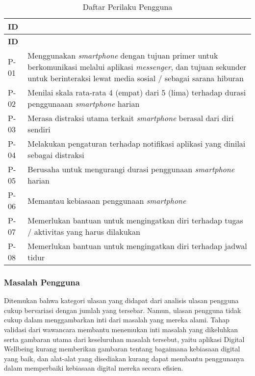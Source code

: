 \RaggedLeft
\begin{small}
\begin{longtable}[c]{|W{c}{0.08\textwidth}|>{\ccnormspacing}m{0.82\textwidth}|}
  \caption{Daftar Perilaku Pengguna}
  \label{tab:perilaku_pengguna} \\
  \hline {} \textbf{ID} &  \\ \hline \endfirsthead
  \hline {} \textbf{ID} &  \\ \hline \endhead
  
  \hline \endfoot
  
  P-01  &  Menggunakan \textit{smartphone} dengan tujuan primer untuk berkomunikasi melalui aplikasi \textit{messenger}, dan tujuan sekunder untuk berinteraksi lewat media sosial / sebagai sarana hiburan  \\ \hline
  P-02  &  Menilai skala rata-rata 4 (empat) dari 5 (lima) terhadap durasi penggunaaan \textit{smartphone} harian \\ \hline
  P-03  &  Merasa distraksi utama terkait \textit{smartphone} berasal dari diri sendiri \\ \hline
  P-04  &  Melakukan pengaturan terhadap notifikasi aplikasi yang dinilai sebagai distraksi \\ \hline
  P-05  &  Berusaha untuk mengurangi durasi penggunaan \textit{smartphone} harian \\ \hline
  P-06  &  Memantau kebiasaan penggunaan \textit{smartphone} \\ \hline
  P-07  &  Memerlukan bantuan untuk mengingatkan diri terhadap tugas / aktivitas yang harus dilakukan \\ \hline
  P-08  &  Memerlukan bantuan untuk mengingatkan diri terhadap jadwal tidur \\ \hline
\end{longtable}
\end{small}
\justifying

\FloatBarrier

\subsubsection{Masalah Pengguna}
\label{subsubsec:masalah_pengguna}

Ditemukan bahwa kategori ulasan yang didapat dari analisis ulasan pengguna cukup bervariasi dengan jumlah yang tersebar. Namun, ulasan pengguna tidak cukup dalam menggambarkan inti dari masalah yang mereka alami. Tahap validasi dari wawancara membantu menemukan inti masalah yang dikeluhkan serta gambaran utama dari keseluruhan masalah tersebut, yaitu aplikasi Digital Wellbeing kurang memberikan gambaran tentang bagaimana kebiasaan digital yang baik, dan alat-alat yang disediakan kurang dapat membantu penggunanya dalam memperbaiki kebiasaan digital mereka secara efisien.


